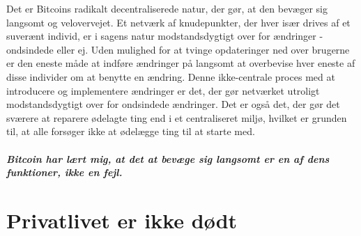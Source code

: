 \documentclass[paper=6in:9in,pagesize=pdftex,
               headinclude=on,footinclude=on,12pt]{scrbook}
\begin{document}
Det er Bitcoins radikalt decentraliserede natur, der gør, at den bevæger sig langsomt og velovervejet. Et netværk af knudepunkter, der hver især drives af et suverænt individ, er i sagens natur modstandsdygtigt over for ændringer - ondsindede eller ej. Uden mulighed for at tvinge opdateringer ned over brugerne er den eneste måde at indføre ændringer på langsomt at overbevise hver eneste af disse individer om at benytte en ændring. Denne ikke-centrale proces med at introducere og implementere ændringer er det, der gør netværket utroligt modstandsdygtigt over for ondsindede ændringer. Det er også det, der gør det sværere at reparere ødelagte ting end i et centraliseret miljø, hvilket er grunden til, at alle forsøger ikke at ødelægge ting til at starte med.\paragraph{Bitcoin har lært mig, at det at bevæge sig langsomt er en af dens funktioner, ikke en fejl.}%
%
%
%
%
%
%
%

\chapter{Privatlivet er ikke dødt}
\label{les:19}
\end{document}
